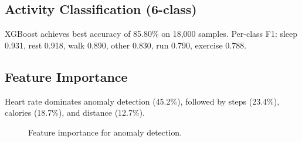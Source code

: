 \subsection{Activity Classification (6-class)}
XGBoost achieves best accuracy of 85.80\% on 18,000 samples. Per-class F1: sleep 0.931, rest 0.918, walk 0.890, other 0.830, run 0.790, exercise 0.788.

\subsection{Feature Importance}
Heart rate dominates anomaly detection (45.2\%), followed by steps (23.4\%), calories (18.7\%), and distance (12.7\%).

\begin{figure}[H]
\centering
{}
\caption{Feature importance for anomaly detection.}
\label{fig:feat_imp}
\end{figure}
